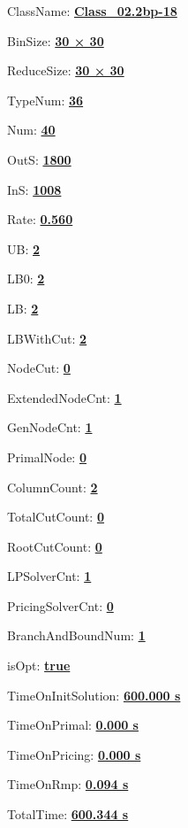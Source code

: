 \documentclass[11pt]{article}
\begin{document}
\pagestyle{empty}


ClassName: \underline{\textbf{Class_02.2bp-18}}
\par
BinSize: \underline{\textbf{30 × 30}}
\par
ReduceSize: \underline{\textbf{30 × 30}}
\par
TypeNum: \underline{\textbf{36}}
\par
Num: \underline{\textbf{40}}
\par
OutS: \underline{\textbf{1800}}
\par
InS: \underline{\textbf{1008}}
\par
Rate: \underline{\textbf{0.560}}
\par
UB: \underline{\textbf{2}}
\par
LB0: \underline{\textbf{2}}
\par
LB: \underline{\textbf{2}}
\par
LBWithCut: \underline{\textbf{2}}
\par
NodeCut: \underline{\textbf{0}}
\par
ExtendedNodeCnt: \underline{\textbf{1}}
\par
GenNodeCnt: \underline{\textbf{1}}
\par
PrimalNode: \underline{\textbf{0}}
\par
ColumnCount: \underline{\textbf{2}}
\par
TotalCutCount: \underline{\textbf{0}}
\par
RootCutCount: \underline{\textbf{0}}
\par
LPSolverCnt: \underline{\textbf{1}}
\par
PricingSolverCnt: \underline{\textbf{0}}
\par
BranchAndBoundNum: \underline{\textbf{1}}
\par
isOpt: \underline{\textbf{true}}
\par
TimeOnInitSolution: \underline{\textbf{600.000 s}}
\par
TimeOnPrimal: \underline{\textbf{0.000 s}}
\par
TimeOnPricing: \underline{\textbf{0.000 s}}
\par
TimeOnRmp: \underline{\textbf{0.094 s}}
\par
TotalTime: \underline{\textbf{600.344 s}}
\par
\newpage
\end{document}
